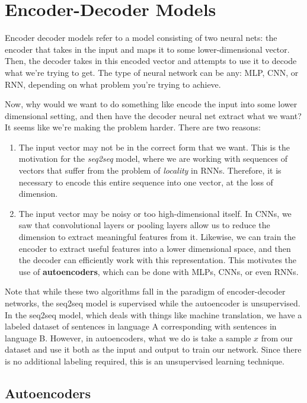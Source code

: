 \section{Encoder-Decoder Models}

  Encoder decoder models refer to a model consisting of two neural nets: the encoder that takes in the input and maps it to some lower-dimensional vector. Then, the decoder takes in this encoded vector and attempts to use it to decode what we're trying to get. The type of neural network can be any: MLP, CNN, or RNN, depending on what problem you're trying to achieve. 

  Now, why would we want to do something like encode the input into some lower dimensional setting, and then have the decoder neural net extract what we want? It seems like we're making the problem harder. There are two reasons: 
  \begin{enumerate}
    \item The input vector may not be in the correct form that we want. This is the motivation for the \textit{seq2seq} model, where we are working with sequences of vectors that suffer from the problem of \textit{locality} in RNNs. Therefore, it is necessary to encode this entire sequence into one vector, at the loss of dimension. 

    \item The input vector may be noisy or too high-dimensional itself. In CNNs, we saw that convolutional layers or pooling layers allow us to reduce the dimension to extract meaningful features from it. Likewise, we can train the encoder to extract useful features into a lower dimensional space, and then the decoder can efficiently work with this representation. This motivates the use of \textbf{autoencoders}, which can be done with MLPs, CNNs, or even RNNs. 
  \end{enumerate}

  Note that while these two algorithms fall in the paradigm of encoder-decoder networks, the seq2seq model is supervised while the autoencoder is unsupervised. In the seq2seq model, which deals with things like machine translation, we have a labeled dataset of sentences in language A corresponding with sentences in language B. However, in autoencoders, what we do is take a sample $x$ from our dataset and use it both as the input and output to train our network. Since there is no additional labeling required, this is an unsupervised learning technique. 

  \subsection{Autoencoders}

